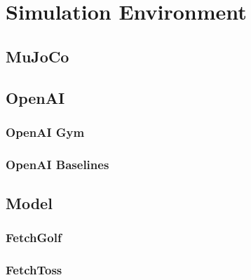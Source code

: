 \chapter{Simulation Environment}





\section{MuJoCo}





\section{OpenAI}





\subsection{OpenAI Gym}




\subsection{OpenAI Baselines}




\section{Model}



\subsection{FetchGolf}



\subsection{FetchToss}